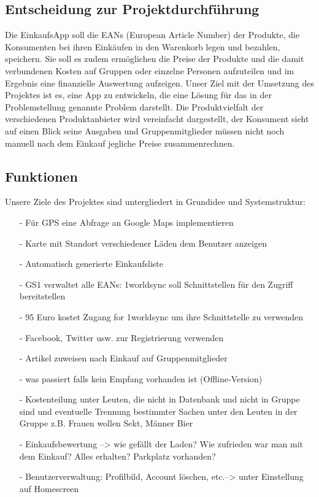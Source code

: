 \documentclass[12pt,a4paper]{article}
\begin{document}
\subsection{Entscheidung zur Projektdurchführung}
Die EinkaufsApp soll die EANs (European Article Number) der Produkte, die Konsumenten bei ihren Einkäufen in den Warenkorb legen und bezahlen, speichern.
Sie soll es zudem ermöglichen die Preise der Produkte und die damit verbundenen Kosten auf Gruppen oder einzelne Personen aufzuteilen und im Ergebnis eine finanzielle Auswertung aufzeigen.
Unser Ziel mit der Umsetzung des Projektes ist es, eine App zu entwickeln, die eine Lösung für das in der Problemstellung genannte Problem darstellt. 
Die Produktvielfalt der verschiedenen Produktanbieter wird vereinfacht dargestellt, der Konsument sieht auf einen Blick seine Ausgaben und Gruppenmitglieder müssen nicht noch manuell nach dem Einkauf jegliche Preise zusammenrechnen.

\newpage

\subsection{Funktionen}
Unsere Ziele des Projektes sind untergliedert in Grundidee und Systemstruktur:
\begin{itemize}
\item[-] Für GPS eine Abfrage an Google Maps implementieren
\item[-] Karte mit Standort verschiedener Läden dem Benutzer anzeigen
\item[-] Automatisch generierte Einkaufsliste
\item[-] GS1 verwaltet alle EANs: 1worldsync soll Schnittstellen für den Zugriff bereitstellen
\item[-] 95 Euro kostet Zugang for 1worldsync um ihre Schnittstelle zu verwenden
\item[-] Facebook, Twitter usw. zur Registrierung verwenden
\item[-] Artikel zuweisen nach Einkauf auf Gruppenmitglieder 
\item[-] was passiert falls kein Empfang vorhanden ist (Offline-Version)
\item[-] Kostenteilung unter Leuten, die nicht in Datenbank und nicht in Gruppe sind und eventuelle Trennung bestimmter Sachen unter den Leuten in der Gruppe z.B. Frauen wollen Sekt, Männer Bier
\item[-] Einkaufsbewertung --> wie gefällt der Laden? Wie zufrieden war man mit dem Einkauf? Alles erhalten? Parkplatz 
vorhanden?
\item[-] Benutzerverwaltung: Profilbild, Account löschen, etc.--> unter Einstellung auf Homescreen
\end{itemize}
\end{document}
